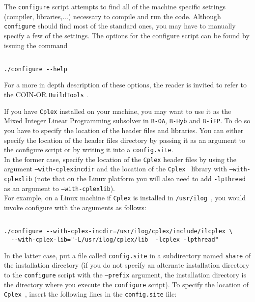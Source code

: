 The {\tt configure} script attempts to find all of the machine specific settings (compiler, libraries,...)
necessary to compile and run the code. Although {\tt configure} should find most of the standard
ones, you may have to manually specify a few of the settings.
The options for the configure script can be found by issuing the command

\begin{colorverb}
\begin{verbatim}

./configure --help

\end{verbatim}
\end{colorverb}

For a more in depth description of these options,
the reader is invited to refer to the COIN-OR {\tt BuildTools} .

If you have {\tt Cplex} installed on your machine, you may want to use it
as the Mixed Integer Linear Programming subsolver in {\tt B-OA}, {\tt B-Hyb}
and {\tt B-iFP}.
To do so you have to specify the location of the header files and libraries.
You can either specify the location of the header files directory by passing it as an
argument to the configure script or by writing it into a {\tt config.site}.\\

In the former case, specify the location of the {\tt Cplex} header files by using the
argument {\tt --with-cplexincdir} and the location of the
{\tt Cplex } library with {\tt --with-cplexlib} (note that on the Linux platform you will also
need to add {\tt -lpthread} as an argument to {\tt --with-cplexlib}).\\

For example, on a Linux machine if {\tt Cplex} is installed in {\tt /usr/ilog}~, you would
invoke configure with the arguments as follows:

\begin{colorverb}
\begin{verbatim}

./configure --with-cplex-incdir=/usr/ilog/cplex/include/ilcplex \
  --with-cplex-lib="-L/usr/ilog/cplex/lib  -lcplex -lpthread"
 \end{verbatim}
 \end{colorverb}
 
In the latter case, put a file called {\tt config.site} in a subdirectory named
{\tt share} of the installation directory (if you do not specify an alternate
installation directory to the {\tt configure} script with the {\tt --prefix}
argument, the installation directory is the directory where you execute the
{\tt configure} script). To specify the location of {\tt Cplex}~, insert the
following lines in the {\tt config.site} file:

